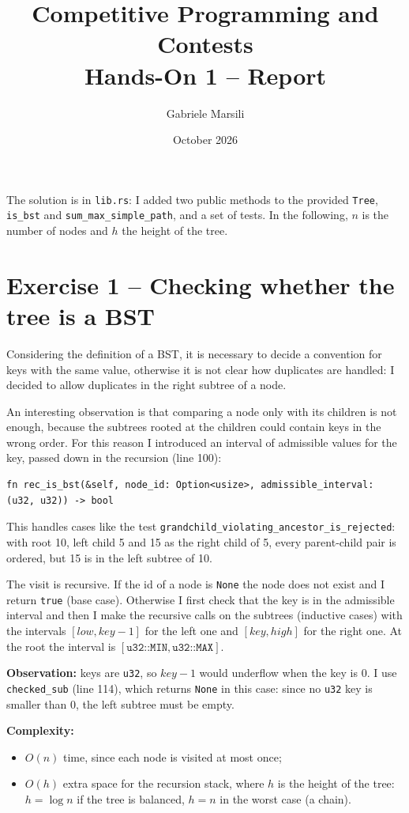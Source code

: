 \documentclass[11pt,a4paper]{article}
\title{Competitive Programming and Contests\\Hands-On 1 -- Report}
\author{Gabriele Marsili}
\date{October 2026}
\begin{document}
\sloppy
\maketitle

The solution is in \texttt{lib.rs}: I added two public methods to the provided \texttt{Tree},
\texttt{is\_bst} and \texttt{sum\_max\_simple\_path}, and a set of tests.
In the following, $n$ is the number of nodes and $h$ the height of the tree.

\section*{Exercise 1 -- Checking whether the tree is a BST}

Considering the definition of a BST, it is necessary to decide a convention for keys with the same value,
otherwise it is not clear how duplicates are handled: I decided to allow duplicates in the right subtree of
a node.

An interesting observation is that comparing a node only with its children is not enough, because the
subtrees rooted at the children could contain keys in the wrong order. For this reason I introduced an
interval of admissible values for the key, passed down in the recursion (line 100):
\begin{lstlisting}
fn rec_is_bst(&self, node_id: Option<usize>, admissible_interval: (u32, u32)) -> bool
\end{lstlisting}
This handles cases like the test \texttt{grandchild\_violating\_ancestor\_is\_rejected}: with root 10, left
child 5 and 15 as the right child of 5, every parent-child pair is ordered, but 15 is in the left subtree
of 10.

The visit is recursive. If the id of a node is \texttt{None} the node does not exist and I return
\texttt{true} (base case). Otherwise I first check that the key is in the admissible interval and then I make
the recursive calls on the subtrees (inductive cases) with the intervals $[\mathit{low}, \mathit{key}-1]$ for
the left one and $[\mathit{key}, \mathit{high}]$ for the right one. At the root the interval is
$[\texttt{u32::MIN}, \texttt{u32::MAX}]$.

\textbf{Observation:} keys are \texttt{u32}, so $\mathit{key}-1$ would underflow when the key is 0. I use
\texttt{checked\_sub} (line 114), which returns \texttt{None} in this case: since no \texttt{u32} key is
smaller than 0, the left subtree must be empty.

\textbf{Complexity:}
\begin{itemize}
\item $O(n)$ time, since each node is visited at most once;
\item $O(h)$ extra space for the recursion stack, where $h$ is the height of the tree: $h = \log n$ if the
tree is balanced, $h = n$ in the worst case (a chain).
\end{itemize}
\end{document}
